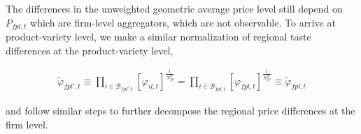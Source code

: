 The differences in the unweighted geometric average price level still depend on $P_{fpl,t}$ which are firm-level aggregators, which are not observable. To arrive at product-variety level, we make a similar normalization of regional taste differences at the product-variety level, 
\begin{linenomath*}
    \begin{equation*}
        \begin{aligned}
            \tilde{\varphi}_{fpl',t} 
                \equiv \prod_{i \in \mathcal{B}_{fpl',t}} \left[\varphi_{il,t} \right]^{\frac{1}{N^{ll'}_{fp}}} 
                = \prod_{i \in \mathcal{B}_{fpl,t}} \left[\varphi_{fpl,t} \right]^{\frac{1}{N^{ll'}_{fp}}} 
                \equiv  \tilde{\varphi}_{fpl,t}
        \end{aligned}
    \end{equation*}
\end{linenomath*}
and follow similar steps to further decompose the regional price differences at the firm level. 
